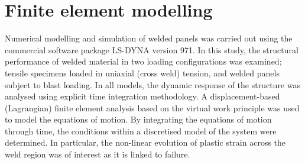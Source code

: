 \section{Finite element modelling}
\label{FE}
Numerical modelling and simulation of welded panels was carried out using the commercial software package LS-DYNA version 971. In this study, the structural performance of welded material in two loading configurations was examined;  tensile specimens loaded in uniaxial (cross weld) tension, and welded panels subject to blast loading. In all models, the dynamic response of the structure was analysed using explicit time integration methodology. A displacement-based (Lagrangian) finite element analysis based on the virtual work principle was used to model the equations of motion. By integrating the equations of motion through time, the conditions within a discretised model of the system were determined. In particular, the non-linear evolution of plastic strain across the weld region was of interest as it is linked to failure. 
